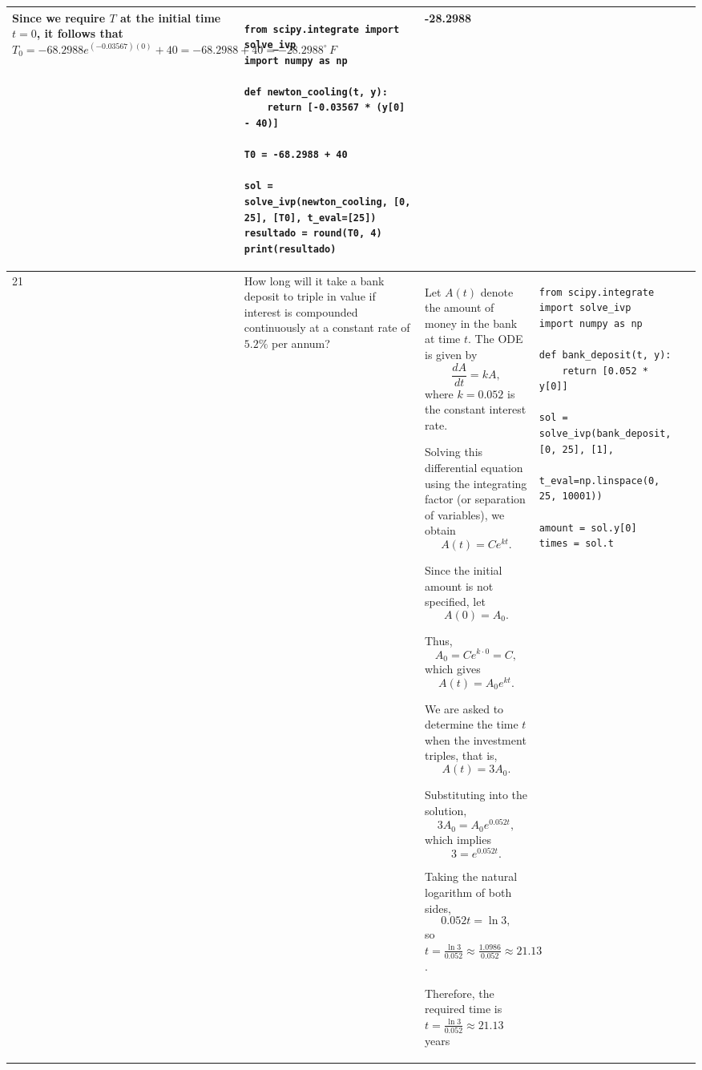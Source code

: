 \documentclass[a4paper,12pt]{article}
\begin{document}
\begin{longtable}{|p{0.3cm}|p{}|p{10cm}|p{}|p{1.5cm}|}
Since we require \( T \) at the initial time \( t = 0 \), it follows  that
$T_0 = -68.2988e^{(-0.03567)(0)} + 40 = -68.2988 + 40 = -28.2988^\circ \, F$

               & \begin{verbatim}
from scipy.integrate import solve_ivp
import numpy as np

def newton_cooling(t, y):
    return [-0.03567 * (y[0] - 40)]

T0 = -68.2988 + 40

sol = solve_ivp(newton_cooling, [0, 25], [T0], t_eval=[25])
resultado = round(T0, 4)
print(resultado)\end{verbatim}&  -28.2988               \\ \hline

21            & How long will it take a bank deposit to triple in value if interest is compounded continuously at a constant rate of \(5.2\%\) per annum?


              & Let \(A(t)\) denote the amount of money in the bank at time \(t\).
The ODE is given by
\[
\frac{dA}{dt}=kA,
\]
where \(k=0.052\) is the constant interest rate.

Solving this differential equation using the integrating factor (or separation of variables), we obtain
\[
A(t)=Ce^{kt}.
\]

Since the initial amount is not specified, let
\[
A(0)=A_0.
\]

Thus,
\[
A_0=Ce^{k\cdot0}=C,
\]
which gives
\[
A(t)=A_0e^{kt}.
\]

We are asked to determine the time \(t\) when the investment triples, that is,
\[
A(t)=3A_0.
\]

Substituting into the solution,
\[
3A_0=A_0e^{0.052t},
\]
which implies
\[
3=e^{0.052t}.
\]

Taking the natural logarithm of both sides,
\[
0.052t=\ln 3,
\]
so $
t=\frac{\ln 3}{0.052}\approx\frac{1.0986}{0.052}\approx21.13$.

Therefore, the required time is $t=\frac{\ln 3}{0.052} \approx 21.13$  years

                &\begin{verbatim}from scipy.integrate import solve_ivp
import numpy as np

def bank_deposit(t, y):
    return [0.052 * y[0]]

sol = solve_ivp(bank_deposit, [0, 25], [1],
                t_eval=np.linspace(0, 25, 10001))

amount = sol.y[0]
times = sol.t


\end{verbatim}
\end{longtable}
\end{document}
